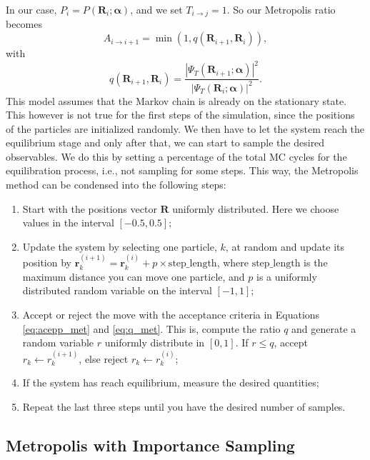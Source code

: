 \documentclass[aps,reprint,superscriptaddress,nofootinbib]{revtex4-2}
\begin{document}
    In our case, \(P_i = P(\bm R_i; \bm \alpha)\), and we set \(T_{i \rightarrow j} = 1\). So our Metropolis ratio becomes 
    \begin{equation} \label{eq:acepp_met}
        A_{i \rightarrow i+1} = \min \left( 1, q(\bm R_{i+1}, \bm R_i) \right),
    \end{equation}
    with 
    \begin{equation} \label{eq:q_met}
        q(\bm R_{i+1}, \bm R_i) = \frac{\left| \Psi_T(\bm R_{i+1}; \bm \alpha) \right|^2}{\left| \Psi_T(\bm R_{i}; \bm \alpha) \right|^2}.
    \end{equation}
    This model assumes that the Markov chain is already on the stationary state. This however is not true for the first steps of the simulation, since the positions of the particles are initialized randomly. We then have to let the system reach the equilibrium stage and only after that, we can start to sample the desired observables. We do this by setting a percentage of the total MC cycles for the equilibration process, i.e., not sampling for some steps. This way, the Metropolis method can be condensed into the following steps:
    \begin{enumerate}
        \item Start with the positions vector \(\bm R\) uniformly distributed. Here we choose values in the interval \([-0.5, 0.5]\);
        \item Update the system by selecting one particle, \(k\), at random and update its position by \(\bm r_k^{(i+1)} = \bm r_k^{(i)} + p \times \text{step}\_\text{length} \), where \(\text{step}\_\text{length}\) is the maximum distance you can move one particle, and \(p\) is a uniformly distributed random variable on the interval \([-1, 1]\);
        \item Accept or reject the move with the acceptance criteria in Equations \eqref{eq:acepp_met} and \eqref{eq:q_met}. This is, compute the ratio \(q\) and generate a random variable \(r\) uniformly distribute in \([0, 1]\). If \(r \leq q\), accept \(r_k \leftarrow r_k^{(i+1)}\), else reject \(r_k \leftarrow r_k^{(i)}\);
        \item If the system has reach equilibrium, measure the desired quantities;
        \item Repeat the last three steps until you have the desired number of samples.
    \end{enumerate}
    
\subsection*{Metropolis with Importance Sampling}
\end{document}
